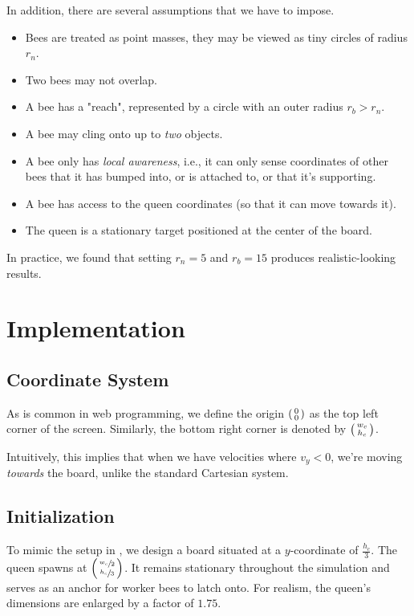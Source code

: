 \documentclass[a4paper,11pt]{article}
\begin{document}
In addition, there are several assumptions that we have to impose.

\begin{itemize}
    \item Bees are treated as point masses, they may be viewed as tiny circles of radius $r_{n}$.
    \item Two bees may not overlap.
    \item A bee has a "reach", represented by a circle with an outer radius $r_{b} > r_{n}$.
    \item A bee may cling onto up to \textit{two} objects.
    \item A bee only has \textit{local awareness}, i.e., it can only sense coordinates
    of other bees that it has bumped into, or is attached to, or that it's supporting.
    \item A bee has access to the queen coordinates (so that it can move towards it).
    \item The queen is a stationary target positioned at the center of the board.
\end{itemize}

In practice, we found that setting $r_{n} = 5$ and $r_{b} = 15$ produces realistic-looking results.

\section{Implementation}

\subsection{Coordinate System}
As is common in web programming, we define the origin $\begin{psmallmatrix} 0 \\ 0 \end{psmallmatrix}$
as the top left corner of the screen. Similarly, the bottom right corner is denoted by
$\begin{psmallmatrix} w_{c} \\ h_{c} \end{psmallmatrix}$.

Intuitively, this implies that when we have velocities where $v_{y} < 0$, we're moving
\textit{towards} the board, unlike the standard Cartesian system.

\subsection{Initialization}
To mimic the setup in \cite{peleg2018collective}, we design a board situated at
a $y$-coordinate of $\tfrac{h_{c}}{3}$. The queen spawns at 
$\begin{psmallmatrix} \sfrac{w_{c}}{2} \\ \sfrac{h_{c}}{3} \end{psmallmatrix}$.
It remains stationary throughout the simulation and serves as an anchor
for worker bees to latch onto. For realism, the queen's dimensions are enlarged by
a factor of $1.75$.
\end{document}
